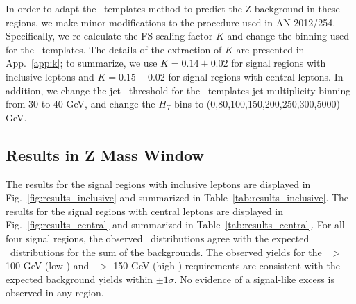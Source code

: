 In order to adapt the \MET\ templates method to predict the Z background in these regions, we make minor modifications
to the procedure used in AN-2012/254. Specifically, we re-calculate
the FS scaling factor $K$ and change the binning used for the \MET\ templates.
The details of the extraction of $K$ are presented in App.~\ref{app:k}; to summarize, we use $K=0.14\pm0.02$ for 
signal regions with inclusive leptons and $K=0.15\pm0.02$ for signal regions with central leptons.
In addition, we change the jet \pt\ threshold for the \MET\ templates jet multiplicity binning from 30 to 40 GeV, and change the $H_T$ bins to
(0,80,100,150,200,250,300,5000) GeV.

\subsection{Results in Z Mass Window}

The results for the signal regions with inclusive leptons are displayed in Fig.~\ref{fig:results_inclusive} and summarized in Table~\ref{tab:results_inclusive}.
The results for the signal regions with central leptons are displayed in Fig.~\ref{fig:results_central} and summarized in Table~\ref{tab:results_central}.
For all four signal regions, the observed \MET\ distributions agree with the expected \MET\ distributions for the sum of the backgrounds.
The observed yields for the \MET\ $>$ 100 GeV (low-\MET) and \MET\ $>$ 150 GeV (high-\MET) requirements are consistent with the
expected background yields within $\pm1\sigma$. No evidence of a signal-like excess is observed in any region.

